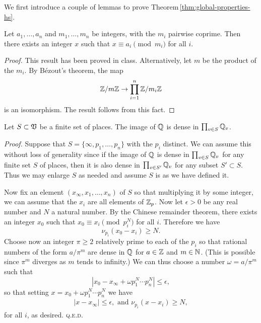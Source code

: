 
We first introduce a couple of lemmas to prove Theorem\,\ref{thm:global-properties-hs}.

\begin{lemmax}\label{lem:chinese-remainder}
    Let \(a_1, \dots, a_n\) and \(m_1, \dots, m_n\) be integers, with the \(m_i\) pairwise coprime. Then there exists an integer \(x\) such that \(x \equiv a_i \pmod{m_i}\) for all \(i\).
\end{lemmax}

\begin{proof}
    This result has been proved in class. Alternatively, let \(m\) be the product of the \(m_i\). By B\'ezout's theorem, the map
    \[\mathbb{Z}/m\mathbb{Z} \to \prod_{i = 1}^n \mathbb{Z}/m_i\mathbb{Z}\]
    is an isomorphism. The result follows from this fact.
\end{proof}

\begin{lemmax}\label{lem:approximation}
    {\normalfont\cite[pp.~24--25]{serre2012course}}
    Let \(S \subset \mathfrak{V}\) be a finite set of places. The image of \(\mathbb{Q}\) is dense in \(\prod_{v \in S} \mathbb{Q}_v\).
\end{lemmax}
    

\emph{Proof.} Suppose that \(S = \{\infty, p_1, \dots, p_n\}\) with the \(p_i\) distinct. We can assume this without loss of generality since if the image of \(\mathbb{Q}\) is dense in \(\prod_{v \in S} \mathbb{Q}_v\) for any finite set \(S\) of places, then it is also dense in \(\prod_{v \in S'} \mathbb{Q}_v\) for any subset \(S' \subset S\). Thus we may enlarge \(S\) as needed and assume \(S\) is as we have defined it.

Now fix an element \((x_{\infty}, x_1, \dots, x_n)\) of \(S\) so that multiplying it by some integer, we can assume that the \(x_i\) are all elements of \(\mathbb{Z}_p\). Now let \(\epsilon > 0\) be any real number and \(N\) a natural number. By the Chinese remainder theorem, there exists an integer \(x_0\) such that \(x_0 \equiv x_i \pmod{p_i^N}\) for all \(i\). Therefore we have
\[
    \nu_{p_i}(x_0 - x_i) \geq N.
\] 
Choose now an integer \(\pi \geq 2\) relatively prime to each of the \(p_i\)  so that rational numbers of the form \(a/\pi^m\) are dense in \(\mathbb{Q}\) for \(a \in \mathbb{Z}\) and \(m \in \mathbb{N}\). (This is possible since \(\pi^m\) diverges as \(m\) tends to infinity.) We can thus choose a number \(\omega = a/\pi^m\) such that
\[
    |x_0 - x_{\infty} + \omega p_1^N\cdots p_n^N| \leq \epsilon,
\]
so that setting \(x = x_0 + \omega p_1^N\cdots p_n^N\) we have
\begin{align*}
    |x - x_{\infty}| \leq \epsilon, \text{ and } \nu_{p_i}(x - x_i) \geq N,
\end{align*}
for all \(i\), as desired. {\scshape q.e.d.}

